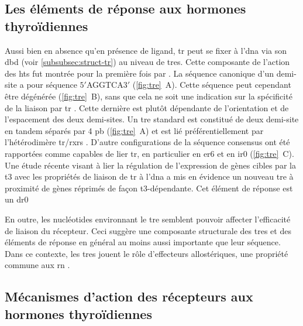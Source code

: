 \documentclass[../main.tex]{subfiles}
\begin{document}



\subsection{Les éléments de réponse aux hormones thyroïdiennes}
Aussi bien en absence qu'en présence de ligand, \gls{tr} peut se fixer à l'\gls{dna} via son \gls{dbd} (voir \autoref{subsubsec:struct-tr}) au niveau de \glspl{tre}.
Cette composante de l'action des \glspl{ht} fut montrée pour la première fois par \citet{Wight1987}.
La séquence canonique d'un demi-site a pour séquence $5\prime$AGGTCA$3\prime$ (\autoref{fig:tre}~A).
Cette séquence peut cependant être dégénérée (\autoref{fig:tre}~B), sans que cela ne soit une indication sur la spécificité de la liaison par \gls{tr} \citep{Chatonnet2013}.
Cette dernière est plutôt dépendante de l'orientation et de l'espacement des deux demi-sites.
Un \gls{tre} standard est constitué de deux demi-site en tandem séparés par 4 \gls{pb} (\autoref{fig:tre}~A) et est lié préférentiellement par l'hétérodimère \gls{tr}/\glspl{rxr} \citep{Wahlstrom1992}.
D'autre configurations de la séquence consensus ont été rapportées comme capables de lier \gls{tr}, en particulier en \gls{er6} et en \gls{ir0} (\autoref{fig:tre}~C).
Une étude récente visant à lier la régulation de l'expression de gènes cibles par la \gls{t3} avec les propriétés de liaison de \gls{tr} à l'\gls{dna} a mis en évidence un nouveau \gls{tre} à proximité de gènes réprimés de façon \gls{t3}-dépendante.
Cet élément de réponse est un \gls{dr0} \citep{Ramadoss2014}



En outre, les nucléotides environnant le \gls{tre} semblent pouvoir affecter l'efficacité de liaison du récepteur.
Ceci suggère une composante structurale des \glspl{tre} et des éléments de réponse en général au moins aussi importante que leur séquence.
Dans ce contexte, les \glspl{tre} jouent le rôle d'effecteurs allostériques, une propriété commune aux \gls{rn} \citep{Hall2002,Billas2013}.


\subsection{Mécanismes d'action des récepteurs aux hormones thyroïdiennes}
\end{document}
